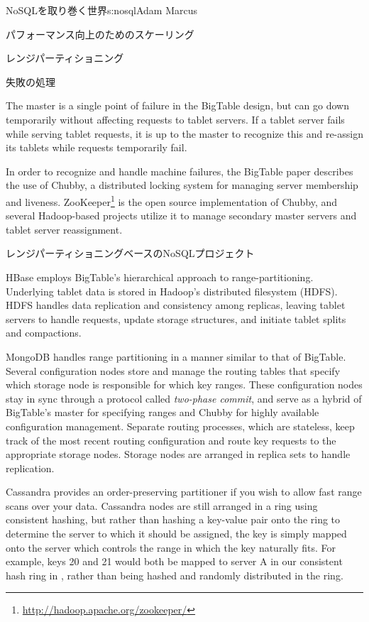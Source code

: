\begin{aosachapter}{NoSQLを取り巻く世界}{s:nosql}{Adam Marcus}
\begin{aosasect1}{パフォーマンス向上のためのスケーリング}
\begin{aosasect2}{レンジパーティショニング}
\vspace{-0.1cm} %
\begin{aosasect3}{失敗の処理}

The master is a single point of failure in the BigTable design, but
can go down temporarily without affecting requests to tablet servers.
If a tablet server fails while serving tablet requests, it is up to
the master to recognize this and re-assign its tablets while requests
temporarily fail.

In order to recognize and handle machine failures, the BigTable paper
describes the use of Chubby, a distributed locking system for managing
server membership and liveness.
ZooKeeper\footnote{\url{http://hadoop.apache.org/zookeeper/}} is the
open source implementation of Chubby, and several Hadoop-based
projects utilize it to manage secondary master servers and tablet
server reassignment.

\end{aosasect3}

\begin{aosasect3}{レンジパーティショニングベースのNoSQLプロジェクト}

HBase employs BigTable's hierarchical approach to range-partitioning.
Underlying tablet data is stored in Hadoop's distributed filesystem
(HDFS).  HDFS handles data replication and consistency among replicas,
leaving tablet servers to handle requests, update storage structures,
and initiate tablet splits and compactions.

MongoDB handles range partitioning in a manner similar to that of
BigTable.  Several configuration nodes store and manage the routing
tables that specify which storage node is responsible for which key
ranges.  These configuration nodes stay in sync through a protocol
called \emph{two-phase commit}, and serve as a hybrid of BigTable's
master for specifying ranges and Chubby for highly available
configuration management.  Separate routing processes, which are
stateless, keep track of the most recent routing configuration and
route key requests to the appropriate storage nodes.  Storage nodes
are arranged in replica sets to handle replication.

Cassandra provides an order-preserving partitioner if you wish to
allow fast range scans over your data.  Cassandra nodes are still arranged
in a ring using consistent hashing, but rather than hashing a
key-value pair onto the ring to determine the server to which it
should be assigned, the key is simply mapped onto the server which
controls the range in which the key naturally fits.  For example, keys
20 and 21 would both be mapped to server A in our consistent hash ring
in , rather than being hashed and
randomly distributed in the ring.


\end{aosasect3}
\end{aosasect2}
\end{aosasect1}
\end{aosachapter}
